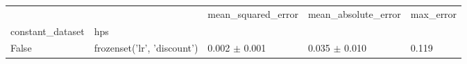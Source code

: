 \begin{tabular}{lllll}
\toprule
 &  & mean_squared_error & mean_absolute_error & max_error \\
constant_dataset & hps &  &  &  \\
\midrule
False & frozenset({'lr', 'discount'}) & 0.002 $\pm$ 0.001 & 0.035 $\pm$ 0.010 & 0.119 \\
\cline{1-5}
\bottomrule
\end{tabular}
